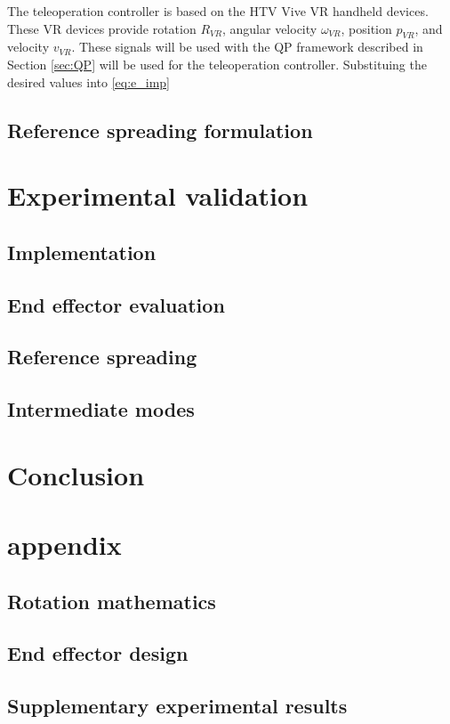 \documentclass[a4paper, 10pt, conference]{ieeeconf}
\begin{document}
    The teleoperation controller is based on the HTV Vive VR handheld devices. These VR devices provide rotation $R_{VR}$, angular velocity $\omega_{VR}$, position $p_{VR}$, and velocity $v_{VR}$. These signals will be used with the QP framework described in Section \ref{sec:QP} will be used for the teleoperation controller. Substituing the desired values into \ref{eq:e_imp}




    \subsection{Reference spreading formulation}

    \section{Experimental validation}
    \subsection{Implementation}
    \subsection{End effector evaluation}
    \subsection{Reference spreading}
    \subsection{Intermediate modes}

    \section{Conclusion}
    
\clearpage
\section*{appendix}
\subsection{Rotation mathematics}
\subsection{End effector design}
\subsection{Supplementary experimental results}
\end{document}
